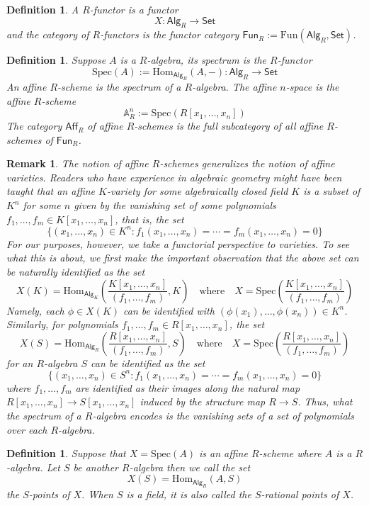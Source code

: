\documentclass[10pt]{book}
\theoremstyle{bookplain}
\theoremstyle{bookdefinition}
\newtheorem{definition}[theorem]{Definition}
\theoremstyle{bookremark}
\newtheorem{remark}[theorem]{Remark}
\begin{document}
\begin{definition}A \textit{$R$-functor} is a functor \[X:\mathsf{Alg}_R\rightarrow \mathsf{Set}\]
    and the \textit{category of $R$-functors} is the functor category $\mathsf{Fun}_R:=\mathrm{Fun}(\mathsf{Alg}_R,\mathsf{Set})$.
\end{definition}
\begin{definition}
Suppose $A$ is a $R$-algebra, its \textit{spectrum} is the $R$-functor 
    \[\mathrm{Spec}(A):=\mathrm{Hom}_{\mathsf{Alg}_R}(A,-):\mathsf{Alg}_R\rightarrow \mathsf{Set}\]
    An \textit{affine $R$-scheme} is the spectrum of a $R$-algebra. The \textit{affine $n$-space} is the affine $R$-scheme \[\mathbb{A}^n_R:=\mathrm{Spec}(R[x_1,\dots,x_n])\]
    The category $\mathsf{Aff}_R$ of affine $R$-schemes is the full subcategory of all affine $R$-schemes of $\mathsf{Fun}_R$. 
\end{definition}
\begin{remark}
The notion of affine $R$-schemes generalizes the notion of affine varieties. 
Readers who have experience in algebraic geometry might have been taught that an affine $K$-variety for some algebraically closed field $K$ is a subset of $K^n$ for some $n$ given by the vanishing set of some polynomials $f_1,\dots,f_m\in K[x_1,\dots,x_n]$, that is, the set
\[\{(x_1,\dots,x_n)\in K^n:f_1(x_1,\dots,x_n)=\cdots=f_m(x_1,\dots,x_n)=0\}\]
For our purposes, however, we take a \textit{functorial} perspective to varieties. To see what this is about, we first make the important observation that the above set can be naturally identified as the set
\[X(K)=\mathrm{Hom}_{\mathsf{Alg}_K}\left(\frac{K[x_1,\dots,x_n]}{(f_1,\dots,f_m)},K\right)\quad\mathrm{where}\quad X=\mathrm{Spec}\left(\frac{K[x_1,\dots,x_n]}{(f_1,\dots,f_m)}\right)\]
Namely, each $\phi\in X(K)$ can be identified with $(\phi(x_1),\dots,\phi(x_n))\in K^n$. 
Similarly, for polynomials $f_1,\dots,f_m\in R[x_1,\dots,x_n]$, the set 
\[X(S)=\mathrm{Hom}_{\mathsf{Alg}_R}\left(\frac{R[x_1,\dots,x_n]}{(f_1,\dots,f_m)},S\right)\quad\mathrm{where}\quad X=\mathrm{Spec}\left(\frac{R[x_1,\dots,x_n]}{(f_1,\dots,f_m)}\right)\]
for an $R$-algebra $S$ can be identified as the set 
\[\{(x_1,\dots,x_n)\in S^n:f_1(x_1,\dots,x_n)=\cdots=f_m(x_1,\dots,x_n)=0\}\]
where $f_1,\dots,f_m$ are identified as their images along the natural map $R[x_1,\dots,x_n]\rightarrow S[x_1,\dots,x_n]$ induced by the structure map $R\rightarrow S$. 
Thus, what the spectrum of a $R$-algebra encodes is the vanishing sets of a set of polynomials over each $R$-algebra. 

\end{remark}
\begin{definition}Suppose that $X=\mathrm{Spec}(A)$ is an affine $R$-scheme where $A$ is a $R$-algebra. Let $S$ be another $R$-algebra then we call the set 
    \[X(S)=\mathrm{Hom}_{\mathsf{Alg}_R}(A,S)\]
    the \textit{$S$-points} of $X$. When $S$ is a field, it is also called the \textit{$S$-rational points} of $X$. 
\end{definition}
\end{document}
